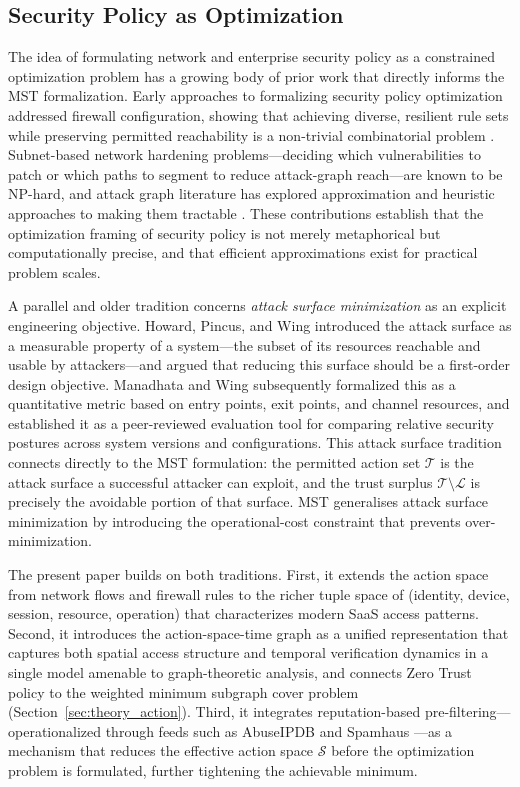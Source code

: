 \documentclass[acmlarge]{acmart}
\begin{document}
\subsection{Security Policy as Optimization}

The idea of formulating network and enterprise security policy as a constrained
optimization problem has a growing body of prior work that directly informs the MST
formalization. Early approaches to formalizing security policy optimization addressed firewall
configuration, showing that achieving diverse, resilient rule sets while preserving
permitted reachability is a non-trivial combinatorial problem \cite{liu2008}. Subnet-based network hardening problems---deciding
which vulnerabilities to patch or which paths to segment to reduce attack-graph
reach---are known to be NP-hard, and attack graph literature has explored
approximation and heuristic approaches to making them tractable
\cite{shandilya2014,garey1979}. These contributions establish that the optimization
framing of security policy is not merely metaphorical but computationally precise,
and that efficient approximations exist for practical problem scales.

A parallel and older tradition concerns \textit{attack surface minimization} as an
explicit engineering objective. Howard, Pincus, and Wing \cite{howard2005} introduced
the attack surface as a measurable property of a system---the subset of its
resources reachable and usable by attackers---and argued that reducing this surface
should be a first-order design objective. Manadhata and Wing \cite{manadhata2011}
subsequently formalized this as a quantitative metric based on entry points, exit
points, and channel resources, and established it as a peer-reviewed evaluation
tool for comparing relative security postures across system versions and
configurations. This attack surface tradition connects directly to the MST
formulation: the permitted action set $\mathcal{T}$ is the attack surface a
successful attacker can exploit, and the trust surplus $\mathcal{T}\setminus
\mathcal{L}$ is precisely the avoidable portion of that surface. MST generalises
attack surface minimization by introducing the operational-cost constraint that
prevents over-minimization.

The present paper builds on both traditions. First, it extends the action
space from network flows and firewall rules to the richer tuple space of (identity,
device, session, resource, operation) that characterizes modern SaaS access patterns.
Second, it introduces the action-space-time graph as a unified representation that
captures both spatial access structure and temporal verification dynamics in a single
model amenable to graph-theoretic analysis, and connects Zero Trust policy to the
weighted minimum subgraph cover problem (Section~\ref{sec:theory_action}). Third, it
integrates reputation-based pre-filtering---operationalized through feeds such as
AbuseIPDB \cite{abuseipdb2024} and Spamhaus \cite{spamhaus2024}---as a mechanism
that reduces the effective action space $\mathcal{S}$ before the optimization
problem is formulated, further tightening the achievable minimum.
\end{document}
